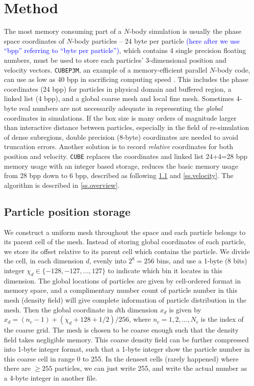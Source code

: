 \documentclass[10pt,twocolumn,preprint]{emulateapj}
\newcommand{\tcb}{\textcolor{blue}}
\begin{document}
\section{Method}\label{s.method}
The most memory consuming part of a $N$-body simulation is usually the phase space coordinates of $N$-body particles -- 24 byte per particle \tcb{(here after we use ``bpp'' referring to ``byte per particle'')}, which contains 4 single precision floating numbers, must be used to store each particles' 3-dimensional position and velocity vectors. {\tt CUBEP3M}, an example of a memory-efficient parallel $N$-body code, can use as low as 40 bpp in sacrificing computing speed \citep{2013MNRAS.436..540H}. This includes the phase coordinates (24 bpp) for particles in physical domain and buffered region, a linked list (4 bpp), and a global coarse mesh and local fine mesh. Sometimes 4-byte real numbers are not necessarily adequate in representing the {\it global} coordinates in simulations. If the box size is many orders of magnitude larger than interactive distance between particles, especially in the field of re-simulation of dense subregions, double precision (8-byte) coordinates are needed to avoid truncation errors. Another solution is to record {\it relative} coordinates for both position and velocity. {\tt CUBE} replaces the coordinates and linked list 24+4=28 bpp memory usage with an integer based storage, reduces the basic memory usage from 28 bpp down to 6 bpp, described as following \ref{ss.position} and \ref{ss.velocity}. The algorithm is described in \ref{ss.overview}.

\subsection{Particle position storage}\label{ss.position}
We construct a uniform mesh throughout the space and each particle belongs to its parent cell of the mesh. Instead of storing global coordinates of each particle, we store its offset relative to its parent cell which contains the particle. We divide the cell, in each dimension $d$, evenly into $2^8=256$ bins, and use a 1-byte (8 bits) integer $\chi_d \in \{-128,-127,...,127\}$ to indicate which bin it locates in this dimension. The global locations of particles are given by cell-ordered format in memory space, and a complimentary number count of particle number in this mesh (density field) will give complete information of particle distribution in the mesh. Then the global coordinate in $d$th dimension $x_d$ is given by $x_d=(n_c-1)+(\chi_d+128+1/2)/256$, where $n_c=1,2,...,N_c$ is the index of the coarse grid. The mesh is chosen to be coarse enough such that the density field takes negligible memory. This coarse density field can be further compressed into 1-byte integer format, such that a 1-byte integer show the particle number in this coarse cell in range 0 to 255. In the densest cells (rarely happened) where there are $\ge 255$ particles, we can just write 255, and write the actual number as a 4-byte integer in another file.
\end{document}
